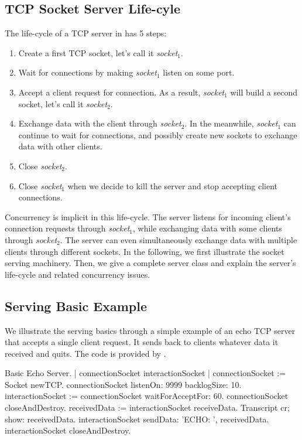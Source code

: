 \documentclass[a4paper,10pt,twoside]{book}
\begin{document}
\subsection{TCP Socket Server Life-cyle}
The life-cycle of a TCP server in \pharo  has 5 steps:
\begin{enumerate}
\item Create a first TCP socket, let's call it \textit{socket$_1$}.
\item Wait for connections by making \textit{socket$_1$}  listen on some port.
\item Accept a client request for connection. As a result, \textit{socket$_1$} will build a second socket, let's call it \textit{socket$_2$}.
\item Exchange data with the client through \textit{socket$_2$}. In the meanwhile, \textit{socket$_1$} can continue to wait for connections, and possibly create new sockets to exchange data with other clients. 
\item Close \textit{socket$_2$}.
\item Close \textit{socket$_1$} when we decide to kill the server and stop accepting client connections.
\end{enumerate}

Concurrency is implicit in this life-cycle.
The server listens for incoming client's connection requests through \textit{socket$_1$}, while exchanging data with some clients through \textit{socket$_2$}.
The server can even simultaneously exchange data with multiple clients through different sockets.
In the following, we first illustrate the socket serving machinery.
Then, we give a complete server class and explain the server's life-cycle and related concurrency issues.

\subsection{Serving Basic Example}
We illustrate the serving basics through a simple example of an echo TCP server that accepts a single client request.
It sends back to clients whatever data it received and quits.
The code is provided by .

\begin{script}[servingBasicExample]{Basic Echo Server.}
| connectionSocket interactionSocket |
connectionSocket := Socket newTCP.
connectionSocket listenOn: 9999 backlogSize: 10.
interactionSocket := connectionSocket waitForAcceptFor: 60.
connectionSocket closeAndDestroy.
receivedData := interactionSocket receiveData.
Transcript cr; show: receivedData.
interactionSocket sendData: 'ECHO: ', receivedData.
interactionSocket closeAndDestroy.
\end{script}
\end{document}
